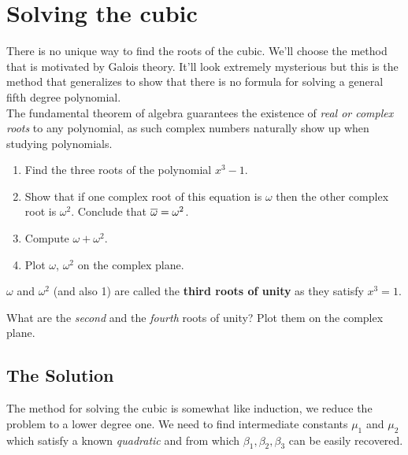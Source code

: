 
\section{Solving the cubic}

There is no unique way to find the roots of the cubic. We'll choose the method that is motivated by Galois theory. It'll look extremely mysterious but this is the method that generalizes to show that there is no formula for solving a general fifth degree polynomial.\\

The fundamental theorem of algebra guarantees the existence of \emph{real or complex roots} to any polynomial, as such complex numbers naturally show up when studying polynomials. 

\begin{questions}
	\item 
	\begin{enumerate}
		\item Find the three roots of the polynomial $ x^3 - 1$.
		\item Show that if one complex root of this equation is $ \omega $ then the other complex root is $ \omega^2$. Conclude that $ \overline{\omega} = \omega^2$.
    \item Compute $ \omega + \omega^2$.
		\item Plot $ \omega$, $\omega^2$ on the complex plane.
	\end{enumerate}
  $ \omega$ and $ \omega^2$ (and also 1) are called the \textbf{third roots of unity} as they satisfy $ x^3 = 1$.
\end{questions}


\begin{questions}[resume]
  \item What are the \emph{second} and the \emph{fourth} roots of unity? Plot them on the complex plane.
\end{questions}






\newpage
\subsection{The Solution}
  The method for solving the cubic is somewhat like induction, we reduce the problem to a lower degree one. We need to find intermediate constants $ \mu_1$ and $ \mu_2$ which satisfy a known \emph{quadratic} and from which $ \beta_1, \beta_2, \beta_3$ can be easily recovered.


